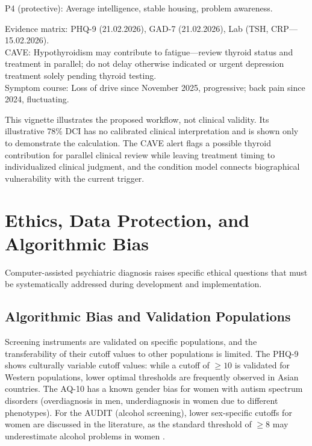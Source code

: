 \documentclass[11pt,a4paper]{article}
\begin{document}
\begin{description}[style=nextline, leftmargin=1.5cm, font=\bfseries\small]
P4 (protective): Average intelligence, stable housing, problem awareness.
\item[Axis~VI (Evidence Collection)]
Evidence matrix: PHQ-9 (21.02.2026), GAD-7 (21.02.2026), Lab (TSH, CRP---15.02.2026). \\
CAVE: Hypothyroidism may contribute to fatigue---review thyroid status and treatment in parallel; do not delay otherwise indicated or urgent depression treatment solely pending thyroid testing. \\
Symptom course: Loss of drive since November 2025, progressive; back pain since 2024, fluctuating.
\end{description}

\noindent This vignette illustrates the proposed workflow, not clinical validity. Its illustrative 78\% DCI has no calibrated clinical interpretation and is shown only to demonstrate the calculation. The CAVE alert flags a possible thyroid contribution for parallel clinical review while leaving treatment timing to individualized clinical judgment, and the condition model connects biographical vulnerability with the current trigger.

\section{Ethics, Data Protection, and Algorithmic Bias}
\label{sec:ethics}

Computer-assisted psychiatric diagnosis raises specific ethical questions that must be systematically addressed during development and implementation.

\subsection{Algorithmic Bias and Validation Populations}

Screening instruments are validated on specific populations, and the transferability of their cutoff values to other populations is limited. The PHQ-9 shows culturally variable cutoff values: while a cutoff of $\geq 10$ is validated for Western populations, lower optimal thresholds are frequently observed in Asian countries. The AQ-10 has a known gender bias for women with autism spectrum disorders (overdiagnosis in men, underdiagnosis in women due to different phenotypes). For the AUDIT (alcohol screening), lower sex-specific cutoffs for women are discussed in the literature, as the standard threshold of $\geq 8$ may underestimate alcohol problems in women \citep{Saunders1993}.
\end{document}
